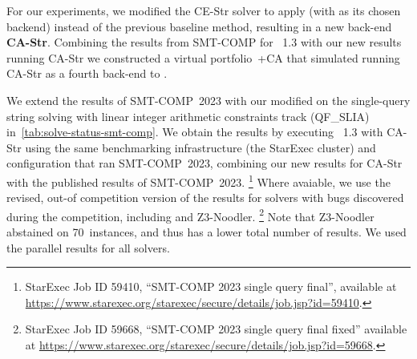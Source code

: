 For our experiments, we modified the CE-Str solver to apply \Catra{}
 (with \Calculus{} as its chosen backend)
instead of the previous baseline method, resulting in a new back-end
\textbf{CA-Str}. Combining the results from SMT-COMP for \Ostrich{}~1.3 
with our new results running CA-Str we constructed a virtual 
portfolio~\Ostrich{}+CA that simulated running CA-Str as a fourth
back-end to \Ostrich{}.

%
%

We extend the results of SMT-COMP~2023 with our modified \Ostrich{}
on the single-query string solving with linear integer arithmetic constraints
track (QF\_SLIA) in~\cref{tab:solve-status-smt-comp}. We obtain
the results by executing \Ostrich{}~1.3 with CA-Str using
the same benchmarking infrastructure (the StarExec cluster)
and configuration that ran SMT-COMP~2023, combining our new results for CA-Str with the
published results of SMT-COMP~2023.
\footnote{StarExec Job ID 59410, \enquote{SMT-COMP 2023 single query final}, 
available at \url{https://www.starexec.org/starexec/secure/details/job.jsp?id=59410}.} 
Where avaiable, we use the revised, out-of
competition version of the results for solvers with bugs discovered during
the competition, including \Ostrich{} and Z3-Noodler. 
\footnote{StarExec Job ID 59668, \enquote{SMT-COMP 2023 single query final fixed} available at
\url{https://www.starexec.org/starexec/secure/details/job.jsp?id=59668}.}
Note that Z3-Noodler abstained on 70~instances, and thus has a lower total number of results.
We used the parallel results for all solvers.

